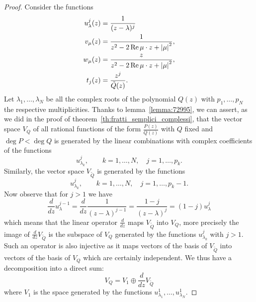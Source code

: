 \begin{proof}
Consider the functions
\begin{align*}
   u_\lambda^j(z) &= \frac{1}{(z-\lambda)^j}\\
   v_\mu(z) &= \frac{1}{z^2-2 \operatorname{Re} \mu\cdot z + {\left|\mu\right|}^2},\\
   w_\mu(z) &= \frac{z}{z^2-2 \operatorname{Re} \mu\cdot z + {\left|\mu\right|}^2},\\
   t_j(z) &= \frac{z^j}{\tilde Q(z)}.
\end{align*}
Let $\lambda_1, \dots, \lambda_N$ be all the complex roots
of the polynomial $Q(z)$ with $p_1, \dots, p_N$
the respective multiplicities.
Thanks to lemma~\ref{lemma:72995}, we can assert,
as we did in the proof of
theorem~\ref{th:fratti_semplici_complessi}, that the
vector space $V_Q$ of all rational functions of the form $\frac{P(z)}{Q(z)}$
with $Q$ fixed and $\deg P<\deg Q$
is generated by the linear combinations
with complex coefficients of the functions
\[
  u_{\lambda_k}^j, \qquad k=1, \dots, N, \quad j=1, \dots, p_k.
\]
Similarly, the vector space $V_{\tilde Q}$
is generated by the functions
\[
  u_{\lambda_k}^j, \qquad k=1, \dots, N, \quad j=1, \dots, p_k-1.
\]
Now observe that for $j>1$ we have
\[
 \frac {d}{dz} u_\lambda^{j-1} =
 \frac {d}{dz} \frac{1}{(z-\lambda)^{j-1}}
 = \frac{1-j}{(z-\lambda)^j} = (1-j) u_\lambda^j
\]
which means that the linear operator $\frac d {dz}$
maps $V_{\tilde Q}$ into $V_Q$, more precisely
the image of $\frac{d}{dz} V_{\tilde Q}$ is the subspace
of $V_Q$ generated by the functions $u_{\lambda_k}^j$
with $j>1$. Such an operator
is also injective as it maps vectors of
the basis of $V_{\tilde Q}$ into vectors of the basis of $V_Q$
which are certainly independent.
We thus have a decomposition into a direct sum:
\[
  V_Q = V_1 \oplus \frac{d}{dz} V_{\tilde Q}
\]
where $V_1$ is the space generated
by the functions $u_{\lambda_1}^1, \dots, u_{\lambda_N}^1$.


\end{proof}
